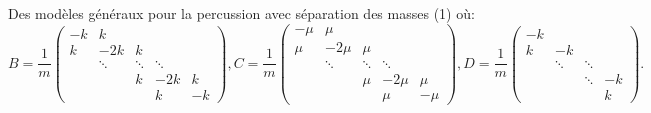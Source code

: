 \begin{frame}{Des modèles généraux pour la percussion avec séparation des masses (1)}
	où:
	\scriptsize
	$$
B = \frac{1}{m} \begin{pmatrix}
    -k & k &  &  &  \\
    k & -2k & k &  &  \\
     & \ddots & \ddots & \ddots &  \\
     &  & k & -2k & k \\
     &  &  & k & -k
    \end{pmatrix} , 
C = \frac{1}{m} \begin{pmatrix}
    -\mu & \mu &  &  &  \\
    \mu & -2\mu & \mu &  &  \\
     & \ddots & \ddots & \ddots &  \\
     &  & \mu & -2\mu & \mu \\
     &  &  & \mu & -\mu
    \end{pmatrix} , 
D = \frac{1}{m} \begin{pmatrix}
    -k &  &  &  \\
    k & -k &  &  \\
     & \ddots & \ddots &  \\
     &  & \ddots & -k \\
     &  &  & k 
    \end{pmatrix}.
	$$
    \normalsize

\end{frame}



